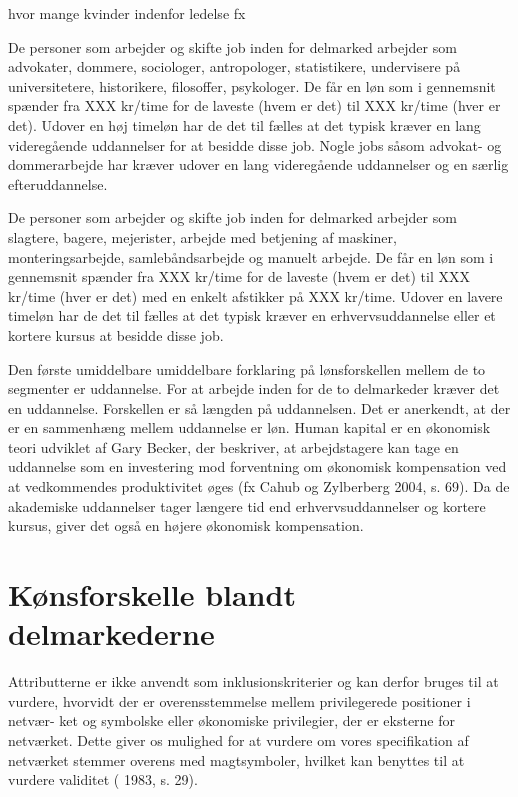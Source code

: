 hvor mange kvinder indenfor ledelse fx 




De personer som arbejder og skifte job inden for delmarked  arbejder som advokater, dommere, sociologer, antropologer, statistikere, undervisere på universitetere, historikere, filosoffer, psykologer. De får en løn som i gennemsnit spænder fra XXX kr/time for de laveste (hvem er det) til XXX kr/time (hver er det). Udover en høj timeløn har de det til fælles at det typisk kræver en lang videregående uddannelser for at besidde disse job. Nogle jobs såsom advokat- og dommerarbejde har kræver udover en lang videregående uddannelser og en særlig efteruddannelse.

De personer som arbejder og skifte job inden for delmarked  arbejder som slagtere, bagere, mejerister, arbejde med betjening af maskiner, monteringsarbejde, samlebåndsarbejde og manuelt arbejde. De får en løn som i gennemsnit spænder fra XXX kr/time for de laveste (hvem er det) til XXX kr/time (hver er det) med en enkelt afstikker på XXX kr/time. Udover en lavere timeløn har de det til fælles at det typisk kræver en erhvervsuddannelse eller et kortere kursus at besidde disse job.

Den første umiddelbare umiddelbare forklaring på lønsforskellen mellem de to segmenter er uddannelse. For at arbejde inden for de to delmarkeder kræver det en uddannelse. Forskellen er så længden på uddannelsen. Det er anerkendt, at der er en sammenhæng mellem uddannelse er løn. Human kapital er en økonomisk teori udviklet af Gary Becker, der beskriver, at arbejdstagere kan tage en uddannelse som en investering mod forventning om økonomisk kompensation ved at vedkommendes produktivitet øges (fx Cahub og Zylberberg 2004, s. 69). Da de akademiske uddannelser tager længere tid end erhvervsuddannelser og kortere kursus, giver det også en højere økonomisk kompensation. 


\newpage \section{Kønsforskelle blandt delmarkederne \label{sec_delanalyse2_loen}}



Attributterne er ikke anvendt som inklusionskriterier og kan derfor bruges til at
vurdere, hvorvidt der er overensstemmelse mellem privilegerede positioner i netvær-
ket og symbolske eller økonomiske privilegier, der er eksterne for netværket. Dette giver
os mulighed for at vurdere om vores specifikation af netværket stemmer overens med
magtsymboler, hvilket kan benyttes til at vurdere validitet ( 1983, s. 29).


